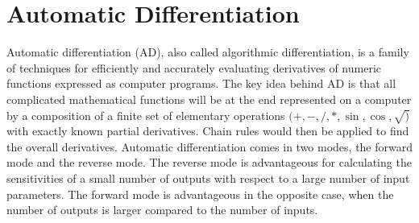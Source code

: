 \documentclass{tufte-handout}
\begin{document}
\section{Automatic Differentiation}
 Automatic differentiation (AD), also called algorithmic differentiation, is a family of techniques for efficiently and accurately evaluating derivatives of numeric functions expressed as computer programs. The key idea behind AD is  that all complicated mathematical functions will be at the end represented on a computer by a composition of a finite set of elementary operations $(+,-,/,*,\sin,\cos,\sqrt )$  with exactly known partial derivatives.  Chain rules would then be applied to find the overall derivatives. Automatic differentiation comes in two modes, the forward mode and the reverse mode.  The reverse mode is advantageous for calculating the sensitivities of a small number of outputs with respect to a large number of input parameters. The forward mode is advantageous in the opposite case, when the number of outputs is larger compared to the number of inputs.



\end{document}
